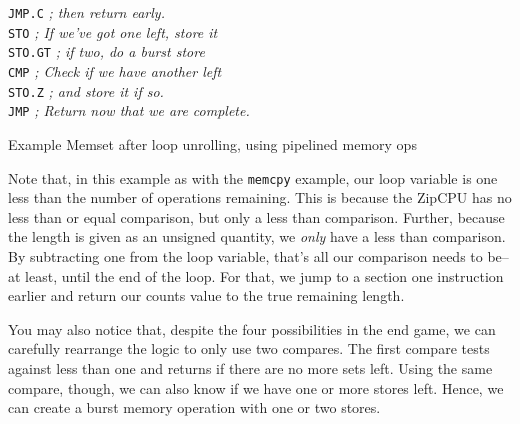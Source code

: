 \documentclass{gqtekspec}
\begin{document}
\begin{table}
\begin{center}
\begin{tabbing}
\>	{\tt JMP.C}	\> {\em ; then return early.}\\
\>	{\tt STO} \> {\em ; If we've got one left, store it}\\
\>	{\tt STO.GT} \> {\em ; if two, do a burst store}\\
\>	{\tt CMP}	\> {\em ; Check if we have another left}\\
\>	{\tt STO.Z}	\> {\em ; and store it if so.}\\
\>	{\tt JMP}	\> {\em ; Return now that we are complete.}
\end{tabbing}
\caption{Example Memset after loop unrolling, using pipelined memory ops}\label{tbl:memset-pipe}
\end{center}\end{table}
Note that, in this example as with the {\tt memcpy} example, our loop variable
is one less than the number of operations remaining.  This is because the ZipCPU
has no less than or equal comparison, but only a less than comparison.  Further,
because the length is given as an unsigned quantity, we {\em only} have a 
less than comparison.  By subtracting one from the loop variable, that's
all our comparison needs to be--at least, until the end of the loop.  For
that, we jump to a section one instruction earlier and return our counts
value to the true remaining length. 

You may also notice that, despite the four possibilities in the end game, we
can carefully rearrange the logic to only use two compares.  The first compare
tests against less than one and returns if there are no more sets left.  Using
the same compare, though, we can also know if we have one or more stores left.
Hence, we can create a burst memory operation with one or two stores.  
\end{document}
